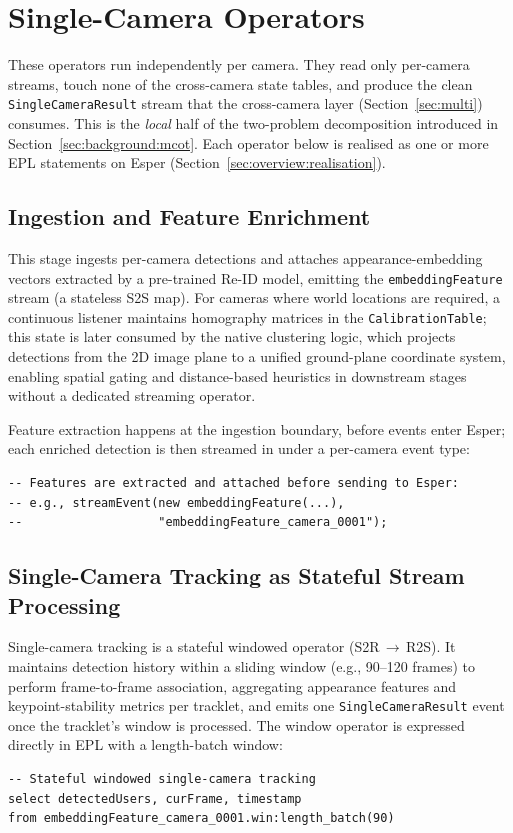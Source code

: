 \documentclass[review]{elsarticle}
\begin{document}
\section{Single-Camera Operators}\label{sec:single}
These operators run independently per camera. They read only per-camera streams, touch none of the cross-camera state tables, and produce the clean \texttt{SingleCameraResult} stream that the cross-camera layer (Section~\ref{sec:multi}) consumes. This is the \emph{local} half of the two-problem decomposition introduced in Section~\ref{sec:background:mcot}. Each operator below is realised as one or more EPL statements on Esper (Section~\ref{sec:overview:realisation}).

\subsection{Ingestion and Feature Enrichment}
\label{sec:single:ingestion}
This stage ingests per-camera detections and attaches appearance-embedding vectors extracted by a pre-trained Re-ID model, emitting the \texttt{embeddingFeature} stream (a stateless S2S map). For cameras where world locations are required, a continuous listener maintains homography matrices in the \texttt{CalibrationTable}; this state is later consumed by the native clustering logic, which projects detections from the 2D image plane to a unified ground-plane coordinate system, enabling spatial gating and distance-based heuristics in downstream stages without a dedicated streaming operator.

Feature extraction happens at the ingestion boundary, before events enter Esper; each enriched detection is then streamed in under a per-camera event type:
\begin{verbatim}
-- Features are extracted and attached before sending to Esper:
-- e.g., streamEvent(new embeddingFeature(...),
--                   "embeddingFeature_camera_0001");
\end{verbatim}

\subsection{Single-Camera Tracking as Stateful Stream Processing}
\label{sec:single:sct}
Single-camera tracking is a stateful windowed operator (S2R\,$\rightarrow$\,R2S). It maintains detection history within a sliding window (e.g., 90--120 frames) to perform frame-to-frame association, aggregating appearance features and keypoint-stability metrics per tracklet, and emits one \texttt{SingleCameraResult} event once the tracklet's window is processed. The window operator is expressed directly in EPL with a length-batch window:
\begin{verbatim}
-- Stateful windowed single-camera tracking
select detectedUsers, curFrame, timestamp
from embeddingFeature_camera_0001.win:length_batch(90)
\end{verbatim}
\end{document}
